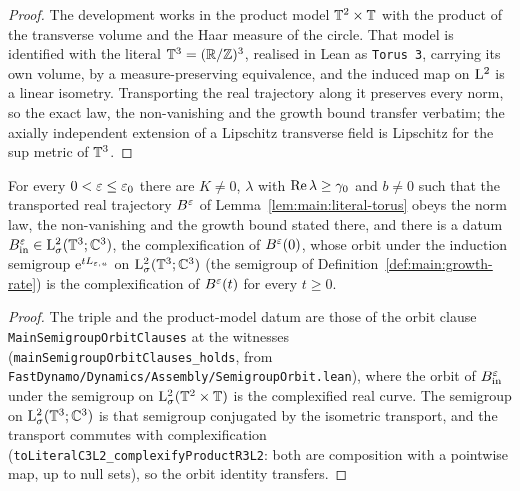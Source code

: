\begin{proof}
  \leanok
  The development works in the product model $\mathbb{T}^2\times\mathbb{T}$ with the product
  of the transverse volume and the Haar measure of the circle.  That model is
  identified with the literal $\mathbb{T}^3=(\mathbb{R}/\mathbb{Z})^3$, realised in Lean as
  \texttt{Torus 3}, carrying its own volume, by a
  measure-preserving equivalence, and the induced map on $\mathrm{L}^2$ is a linear
  isometry.  Transporting the real trajectory along it preserves every norm,
  so the exact law, the non-vanishing and the growth bound transfer verbatim;
  the axially independent extension of a Lipschitz transverse field is
  Lipschitz for the sup metric of $\mathbb{T}^3$.
\end{proof}

\begin{lemma}
  \label{lem:main:literal-torus-solution}
  \leanok
  For every $0<\varepsilon\leq\varepsilon_0$ there are $K\neq0$, $\lambda$ with $\operatorname{Re}\lambda\geq\gamma_0$ and
  $b\neq0$ such that the transported real trajectory $B^\varepsilon$ of
  Lemma~\ref{lem:main:literal-torus} obeys the norm law, the non-vanishing and the growth
  bound stated there, and there is a datum $B_{\rm in}^\varepsilon\in\mathrm{L}^2_\sigma(\mathbb{T}^3;\mathbb{C}^3)$, the
  complexification of $B^\varepsilon(0)$, whose orbit under the induction semigroup
  $\mathrm{e}^{tL_{\varepsilon,u}}$ on $\mathrm{L}^2_\sigma(\mathbb{T}^3;\mathbb{C}^3)$ (the semigroup of
  Definition~\ref{def:main:growth-rate}) is the complexification of $B^\varepsilon(t)$ for every
  $t\geq0$.
\end{lemma}

\begin{proof}
  \leanok
  The triple and the product-model datum are those of the orbit clause
  \texttt{MainSemigroupOrbitClauses} at the witnesses
  (\texttt{mainSemigroupOrbitClauses\_holds}, from
  \texttt{FastDynamo/Dynamics/Assembly/SemigroupOrbit.lean}), where the orbit of $B_{\rm in}^\varepsilon$ under the semigroup on $\mathrm{L}^2_\sigma(\mathbb{T}^2\times\mathbb{T})$ is the
  complexified real curve.  The semigroup on $\mathrm{L}^2_\sigma(\mathbb{T}^3;\mathbb{C}^3)$ is that semigroup
  conjugated by the isometric transport, and the transport commutes with complexification
  (\texttt{toLiteralC3L2\_complexifyProductR3L2}: both are composition with a pointwise map,
  up to null sets), so the orbit identity transfers.
\end{proof}

